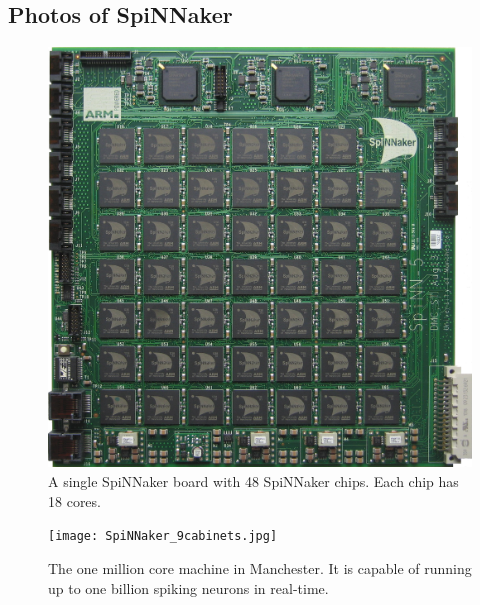 \documentclass{article}
\begin{document}
\begin{appendices}
\section{Photos of SpiNNaker}
\label{sec:spinn_photos}

\begin{figure}[H]
  \includegraphics[width=\linewidth]{spinnakerBoard.jpg}
  \caption{A single SpiNNaker board with 48 SpiNNaker
    chips. Each chip has 18 cores.}
\end{figure}

\begin{figure}[H]
  \texttt{[image: SpiNNaker\_9cabinets.jpg]}
  \caption{The one million core machine in Manchester.
    It is capable of running up to one billion spiking
    neurons in real-time.}
\end{figure}

\end{appendices}
\end{document}
